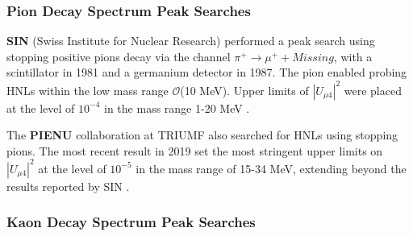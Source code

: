 \subsubsection{Pion Decay Spectrum Peak Searches}

\begin{coloritemize}
\item \textbf{SIN} (Swiss Institute for Nuclear Research) performed a peak search using stopping positive pions decay via the channel $\pi^{+} \rightarrow \mu^{+} + Missing$, with a scintillator in 1981 and a germanium detector in 1987.
The pion enabled probing HNLs within the low mass range $\mathcal{O}$(10 MeV).
Upper limits of $|U_{\mu4}|^{2}$ were placed at the level of $10^{-4}$ in the mass range 1-20 MeV \cite{SIN1, SIN2, SIN3}.

\item The \textbf{PIENU} collaboration at TRIUMF also searched for HNLs using stopping pions.
The most recent result in 2019 set the most stringent upper limits on $|U_{\mu4}|^{2}$ at the level of $10^{-5}$ in the mass range of 15-34 MeV, extending beyond the results reported by SIN \cite{PIENU}.

\end{coloritemize}

\subsubsection{Kaon Decay Spectrum Peak Searches}

